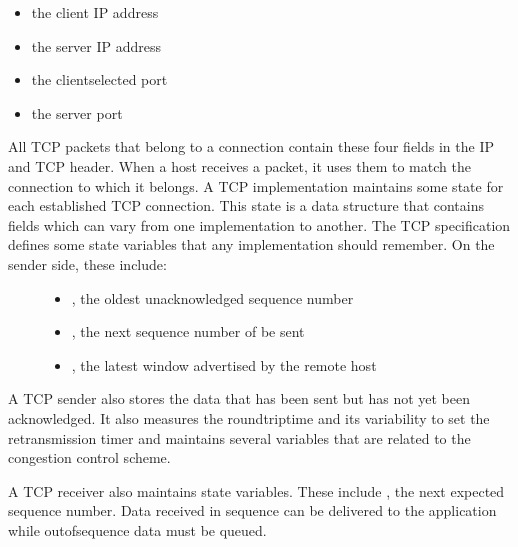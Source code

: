 \documentclass[letterpaper,10pt,english]{sphinxmanual}
\begin{document}
\begin{itemize}
\item {} 
\sphinxAtStartPar
the client IP address

\item {} 
\sphinxAtStartPar
the server IP address

\item {} 
\sphinxAtStartPar
the client\sphinxhyphen{}selected port

\item {} 
\sphinxAtStartPar
the server port

\end{itemize}
\begin{description}
\item[{All TCP packets that belong to a connection contain these four fields in the IP and TCP header. When a host receives a packet, it uses them to match the connection to which it belongs. A TCP implementation maintains some state for each established TCP connection. This state is a data structure that contains fields which can vary from one implementation to another. The TCP specification defines some state variables that any implementation should remember. On the sender side, these include:}] \leavevmode\begin{itemize}
\item {} 
\sphinxAtStartPar
{}, the oldest unacknowledged sequence number

\item {} 
\sphinxAtStartPar
{}, the next sequence number of be sent

\item {} 
\sphinxAtStartPar
{}, the latest window advertised by the remote host

\end{itemize}

\end{description}

\sphinxAtStartPar
A TCP sender also stores the data that has been sent but has not yet been acknowledged. It also measures the round\sphinxhyphen{}trip\sphinxhyphen{}time and its variability to set the retransmission timer and maintains several variables that are related to the congestion control scheme.

\sphinxAtStartPar
A TCP receiver also maintains state variables. These include , the next expected sequence number. Data received in sequence can be delivered to the application while out\sphinxhyphen{}of\sphinxhyphen{}sequence data must be queued.
\end{document}

